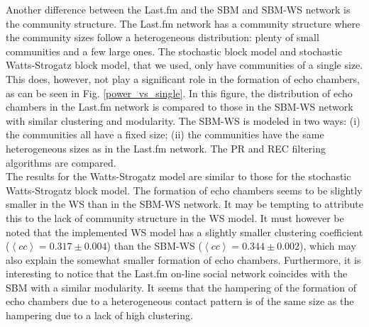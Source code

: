 \documentclass[11 pt , letterpaper , twoside , openright]{book}
\begin{document}
Another difference between the Last.fm and the SBM and SBM-WS network is the community structure. The Last.fm network has a community structure where the community sizes follow a heterogeneous distribution: plenty of small communities and a few large ones. The stochastic block model and stochastic Watts-Strogatz block model, that we used, only have communities of a single size. This does, however, not play a significant role in the formation of echo chambers, as can be seen in Fig. \ref{power_vs_single}. In this figure, the distribution of echo chambers in the Last.fm network is compared to those in the SBM-WS network with similar clustering and modularity. The SBM-WS is modeled in two ways: (i) the communities all have a fixed size; (ii) the communities have the same heterogeneous sizes as in the Last.fm network. The PR and REC filtering algorithms are compared.\\ %
\newpage
\noindent
The results for the Watts-Strogatz model are similar to those for the stochastic Watts-Strogatz block model. The formation of echo chambers seems to be slightly smaller in the WS than in the SBM-WS network. It may be tempting to attribute this to the lack of community structure in the WS model. It must however be noted that the implemented WS model has a slightly smaller clustering coefficient ($\left<cc\right> = 0.317 \pm 0.004$) than the SBM-WS ($\left<cc\right> = 0.344 \pm 0.002$), which may also explain the somewhat smaller formation of echo chambers. Furthermore, it is interesting to notice that the Last.fm on-line social network coincides with the SBM with a similar modularity. It seems that the hampering of the formation of echo chambers due to a heterogeneous contact pattern is of the same size as the hampering due to a lack of high clustering. %
\end{document}
